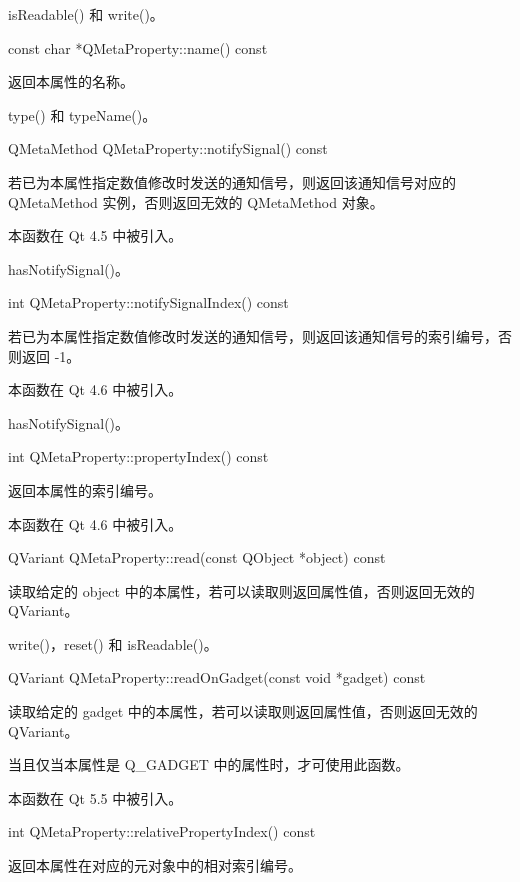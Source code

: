 \begin{seeAlso}
isReadable() 和 write()。
\end{seeAlso}

const char *QMetaProperty::name() const

返回本属性的名称。

\begin{seeAlso}
type() 和 typeName()。
\end{seeAlso}

QMetaMethod QMetaProperty::notifySignal() const

若已为本属性指定数值修改时发送的通知信号，则返回该通知信号对应的 QMetaMethod 实例，否则返回无效的 QMetaMethod 对象。

本函数在 Qt 4.5 中被引入。

\begin{seeAlso}
hasNotifySignal()。
\end{seeAlso}

int QMetaProperty::notifySignalIndex() const

若已为本属性指定数值修改时发送的通知信号，则返回该通知信号的索引编号，否则返回 -1。

本函数在 Qt 4.6 中被引入。

\begin{seeAlso}
hasNotifySignal()。
\end{seeAlso}

int QMetaProperty::propertyIndex() const

返回本属性的索引编号。

本函数在 Qt 4.6 中被引入。

QVariant QMetaProperty::read(const QObject *object) const

读取给定的 object 中的本属性，若可以读取则返回属性值，否则返回无效的 QVariant。

\begin{seeAlso}
write()，reset() 和 isReadable()。
\end{seeAlso}

QVariant QMetaProperty::readOnGadget(const void *gadget) const

读取给定的 gadget 中的本属性，若可以读取则返回属性值，否则返回无效的 QVariant。

当且仅当本属性是 Q\_GADGET 中的属性时，才可使用此函数。

本函数在 Qt 5.5 中被引入。

int QMetaProperty::relativePropertyIndex() const

返回本属性在对应的元对象中的相对索引编号。

